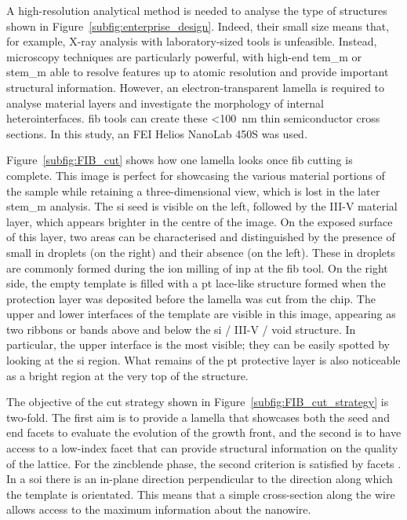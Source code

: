A high-resolution analytical method is needed to analyse the type of structures shown in Figure~\ref{subfig:enterprise_design}. Indeed, their small size means that, for example, X-ray analysis with laboratory-sized tools is unfeasible. Instead, microscopy techniques are particularly powerful, with high-end \acf{tem_m} or \acf{stem_m} able to resolve features up to atomic resolution and provide important structural information. However, an electron-transparent lamella is required to analyse material layers and investigate the morphology of internal heterointerfaces. \Acf{fib} tools can create these <\qty{100}{\nano\metre} thin semiconductor cross sections. In this study, an FEI Helios NanoLab 450S was used.
\par
Figure~\ref{subfig:FIB_cut} shows how one lamella looks once \acs{fib} cutting is complete. This image is perfect for showcasing the various material portions of the sample while retaining a three-dimensional view, which is lost in the later \acs{stem_m} analysis. The \acl{si} seed is visible on the left, followed by the III-V material layer, which appears brighter in the centre of the image. On the exposed surface of this layer, two areas can be characterised and distinguished by the presence of small \acl{in} droplets (on the right) and their absence (on the left). These \acl{in} droplets are commonly formed during the ion milling of \acl{inp} at the \acs{fib} tool. On the right side, the empty template is filled with a \acl{pt} lace-like structure formed when the protection layer was deposited before the lamella was cut from the chip. The upper and lower interfaces of the template are visible in this image, appearing as two ribbons or bands above and below the \acl{si} / III-V / void structure. In particular, the upper interface is the most visible; they can be easily spotted by looking at the \acl{si} region. What remains of the \acl{pt} protective layer is also noticeable as a bright region at the very top of the structure.
\par
The objective of the cut strategy shown in Figure~\ref{subfig:FIB_cut_strategy} is two-fold. The first aim is to provide a lamella that showcases both the seed and end facets to evaluate the evolution of the growth front, and the second is to have access to a low-index facet that can provide structural information on the quality of the lattice. For the zincblende phase, the second criterion is satisfied by  facets \cite{Dasilva2017}. In a  \acs{soi} there is an in-plane \hkl[-1 1 0] direction perpendicular to the \hkl[1 1 0] direction along which the template is orientated. This means that a simple cross-section along the wire allows access to the maximum information about the nanowire.

